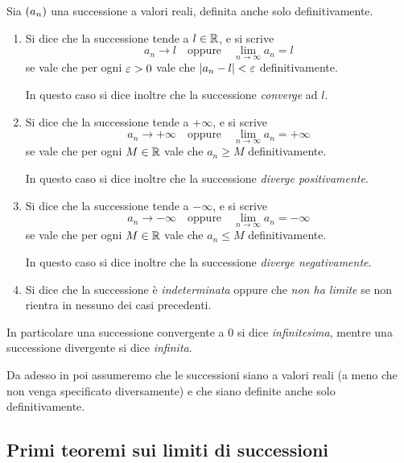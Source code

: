 \begin{definition}
     \label{def:lim_succ}
    Sia $\seqn*{a}$ una successione a valori reali, definita anche solo definitivamente. 
    \begin{enumerate}[label={(\arabic*)}, ref={(\arabic*)}]
        \item \label{def:lim_succ:conv} Si dice che la successione tende a $l \in \R$, e si scrive \[
            a_n \to l \quad \text{oppure} \quad \lim_{n \to \infty} a_n = l    
        \] se vale che per ogni $\eps > 0$ vale che $\abs*{a_n - l} < \eps$ definitivamente.

        In questo caso si dice inoltre che la successione \emph{converge} ad $l$.
        \item \label{def:lim_succ:div_+inf} Si dice che la successione tende a $+\infty$, e si scrive \[
            a_n \to +\infty \quad \text{oppure} \quad \lim_{n \to \infty} a_n = +\infty    
        \] se vale che per ogni $M \in \R$ vale che $a_n \geq M$ definitivamente.

        In questo caso si dice inoltre che la successione \emph{diverge positivamente}.
        \item \label{def:lim_succ:div_-inf} Si dice che la successione tende a $-\infty$, e si scrive \[
            a_n \to -\infty \quad \text{oppure} \quad \lim_{n \to \infty} a_n = -\infty    
        \] se vale che per ogni $M \in \R$ vale che $a_n \leq M$ definitivamente.

        In questo caso si dice inoltre che la successione \emph{diverge negativamente}.
        \item \label{def:lim_succ:no_lim} Si dice che la successione è \emph{indeterminata} oppure che \emph{non ha limite} se non rientra in nessuno dei casi precedenti.
    \end{enumerate}
\end{definition}

In particolare una successione convergente a $0$ si dice \emph{infinitesima}, mentre una successione divergente si dice \emph{infinita}.

Da adesso in poi assumeremo che le successioni siano a valori reali (a meno che non venga specificato diversamente) e che siano definite anche solo definitivamente.

\subsection{Primi teoremi sui limiti di successioni}

